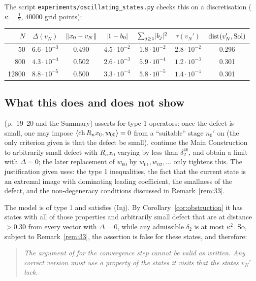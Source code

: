 The script \texttt{experiments/oscillating\_states.py} checks this on a discretisation
($\kappa=\frac12$, $40000$ grid points):
\begin{center}
\begin{tabular}{rcccccc}
\toprule
$N$ & $\Delta(v_N)$ & $\lVert x_0-v_N\rVert$ & $\lvert 1-b_0\rvert$ & $\sum_{j\ge1}\lvert b_j\rvert^2$ & $\tau(v_N')$ & $\operatorname{dist}(v_N',\operatorname{Sol})$\\
\midrule
50 & $6.6\cdot10^{-3}$ & 0.490 & $4.5\cdot10^{-2}$ & $1.8\cdot10^{-2}$ & $2.8\cdot10^{-2}$ & 0.296\\
800 & $4.3\cdot10^{-4}$ & 0.502 & $2.6\cdot10^{-3}$ & $5.9\cdot10^{-4}$ & $1.2\cdot10^{-3}$ & 0.301\\
12800 & $8.8\cdot10^{-5}$ & 0.500 & $3.3\cdot10^{-4}$ & $5.8\cdot10^{-5}$ & $1.4\cdot10^{-4}$ & 0.301\\
\bottomrule
\end{tabular}
\end{center}

\subsection{What this does and does not show}\label{ssec:consequence}
\paper{} (p.~19--20 and the Summary) asserts for type 1 operators: once the defect is small, one
may impose $\langle \mathrm{ch}\,R_nx_0,w_{00}\rangle=0$ from a ``suitable'' stage $n_0'$ on (the only
criterion given is that the defect be small), continue the Main
Construction to arbitrarily small defect with $R_nx_0$ varying by less than $\delta_2^{40}$, and
obtain a limit with $\Delta=0$; the later replacement of $w_{00}$ by $w_{01},w_{02},\dots$ only
tightens this. The justification given uses: the type 1 inequalities, the fact that the
current state is an extremal image with dominating leading coefficient, the smallness of the
defect, and the non-degeneracy conditions discussed in Remark~\ref{rem:33}.

The model is of type 1 and satisfies \textup{(Inj)}. By Corollary~\ref{cor:obstruction} it has
states with all of those properties and arbitrarily small defect that are at distance $>0.30$
from every vector with $\Delta=0$, while any admissible $\delta_2$ is at most $\kappa^2$. So,
subject to Remark~\ref{rem:33}, the assertion is false for these states, and therefore:

\begin{quote}
\emph{The argument of \paper{} for the convergence step cannot be valid as written. Any correct
version must use a property of the states it visits that the states $v_N'$ lack.}
\end{quote}

